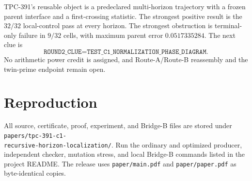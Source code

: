 \documentclass[10pt]{article}
\begin{document}
TPC-391's reusable object is a predeclared multi-horizon trajectory with a
frozen parent interface and a first-crossing statistic.  The strongest
positive result is the $32/32$ local-control pass at every horizon.  The
strongest obstruction is terminal-only failure in $9/32$ cells, with maximum
parent error $0.0517335284$.  The next clue is
\[
 \texttt{ROUND2\_CLUE=TEST\_C1\_NORMALIZATION\_PHASE\_DIAGRAM}.
\]
No arithmetic power credit is assigned, and Route-A/Route-B reassembly and
the twin-prime endpoint remain open.

\section*{Reproduction}

All source, certificate, proof, experiment, and Bridge-B files are stored under
\texttt{papers/tpc-391-c1-}\\
\texttt{recursive-horizon-localization/}.  Run the ordinary and
optimized producer, independent checker, mutation stress, and local Bridge-B
commands listed in the project README.  The release uses
\texttt{paper/main.pdf} and \texttt{paper/paper.pdf} as byte-identical copies.
\end{document}
